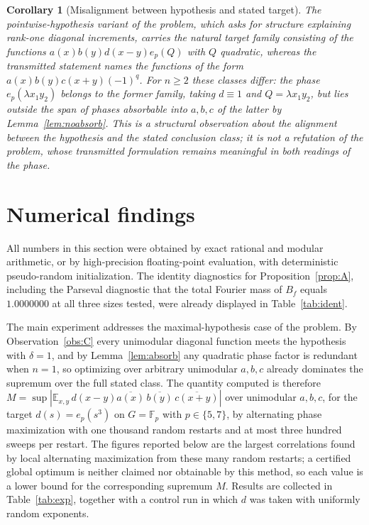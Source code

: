 \documentclass[11pt]{article}
\newtheorem{corollary}{Corollary}
\theoremstyle{remark}
\begin{document}
\begin{corollary}[Misalignment between hypothesis and stated target]\label{cor:misalign}
The pointwise-hypothesis variant of the problem, which asks for structure
explaining rank-one diagonal increments, carries the natural target family
consisting of the functions $a(x)b(y)d(x-y)e_p(Q)$ with $Q$ quadratic,
whereas the transmitted statement names the functions of the form
$a(x)b(y)c(x+y)(-1)^{q}$. For $n\ge2$ these classes differ: the phase
$e_p(\lambda x_1y_2)$ belongs to the former family, taking $d\equiv1$ and
$Q=\lambda x_1y_2$, but lies outside the span of phases absorbable into
$a,b,c$ of the latter by Lemma~\ref{lem:noabsorb}. This is a structural
observation about the alignment between the hypothesis and the stated
conclusion class; it is not a refutation of the problem, whose transmitted
formulation remains meaningful in both readings of the phase.
\end{corollary}

\section{Numerical findings}\label{sec:numerics}

All numbers in this section were obtained by exact rational and modular
arithmetic, or by high-precision floating-point evaluation, with
deterministic pseudo-random initialization. The identity diagnostics for
Proposition~\ref{prop:A}, including the Parseval diagnostic that the total
Fourier mass of $B_f$ equals $1.0000000$ at all three sizes tested, were
already displayed in Table~\ref{tab:ident}.

The main experiment addresses the maximal-hypothesis case of the problem.
By Observation~\ref{obs:C} every unimodular diagonal function meets the
hypothesis with $\delta=1$, and by Lemma~\ref{lem:absorb} any quadratic
phase factor is redundant when $n=1$, so optimizing over arbitrary
unimodular $a,b,c$ already dominates the supremum over the full stated
class. The quantity computed is therefore
$M=\sup| \mathbb{E}_{x,y}\,d(x-y)\overline{a(x)}\,\overline{b(y)}\,
\overline{c(x+y)} |$ over unimodular $a,b,c$, for the target
$d(s)=e_p(s^{3})$ on $G=\mathbb{F}_p$ with $p\in\{5,7\}$, by alternating
phase maximization with one thousand random restarts and at most three
hundred sweeps per restart. The figures reported below are the largest
correlations found by local alternating maximization from these many random
restarts; a certified global optimum is neither claimed nor obtainable by
this method, so each value is a lower bound for the corresponding supremum
$M$. Results are collected in Table~\ref{tab:exp},
together with a control run in which $d$ was taken with uniformly random
exponents.
\end{document}
